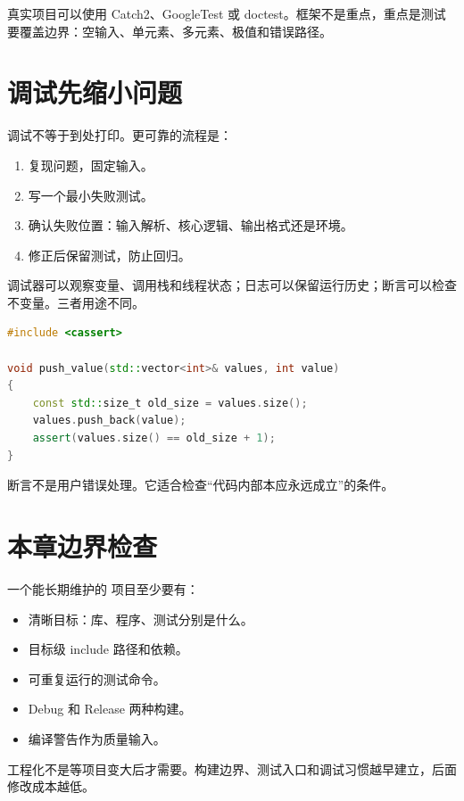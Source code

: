 真实项目可以使用 Catch2、GoogleTest 或 doctest。框架不是重点，重点是测试要覆盖边界：空输入、单元素、多元素、极值和错误路径。

\section{调试先缩小问题}

调试不等于到处打印。更可靠的流程是：

\begin{enumerate}
  \item 复现问题，固定输入。
  \item 写一个最小失败测试。
  \item 确认失败位置：输入解析、核心逻辑、输出格式还是环境。
  \item 修正后保留测试，防止回归。
\end{enumerate}

调试器可以观察变量、调用栈和线程状态；日志可以保留运行历史；断言可以检查不变量。三者用途不同。

\begin{lstlisting}[language=C++,caption={断言用于检查内部不变量}]
#include <cassert>

void push_value(std::vector<int>& values, int value)
{
    const std::size_t old_size = values.size();
    values.push_back(value);
    assert(values.size() == old_size + 1);
}
\end{lstlisting}

断言不是用户错误处理。它适合检查“代码内部本应永远成立”的条件。

\section{本章边界检查}

一个能长期维护的 \cpp 项目至少要有：

\begin{itemize}
  \item 清晰目标：库、程序、测试分别是什么。
  \item 目标级 include 路径和依赖。
  \item 可重复运行的测试命令。
  \item Debug 和 Release 两种构建。
  \item 编译警告作为质量输入。
\end{itemize}

\begin{keyidea}
工程化不是等项目变大后才需要。构建边界、测试入口和调试习惯越早建立，后面修改成本越低。
\end{keyidea}

